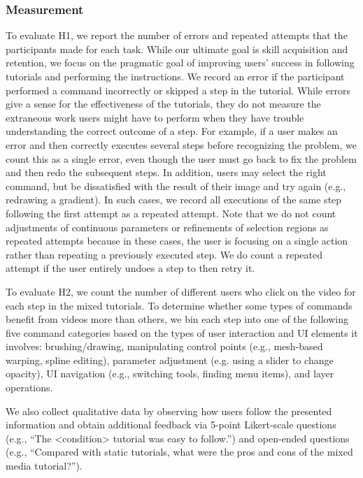 \subsubsection{Measurement}
To evaluate H1, we report the number of errors and repeated attempts that the participants made for each task. While our ultimate goal is skill acquisition and retention, we focus on the pragmatic goal of improving users' success in following tutorials and performing the instructions. We record an error if the participant performed a command incorrectly or skipped a step in the tutorial. While errors give a sense for the effectiveness of the tutorials, they do not measure the extraneous work users might have to perform when they have trouble understanding the correct outcome of a step. For example, if a user makes an error and then correctly executes several steps before recognizing the problem, we count this as a single error, even though the user must go back to fix the problem and then redo the subsequent steps. In addition, users may select the right command, but be dissatisfied with the result of their image and try again (e.g., redrawing a gradient). In such cases, we record all executions of the same step following the first attempt as a repeated attempt. Note that we do not count adjustments of continuous parameters or refinements of selection regions as repeated attempts because in these cases, the user is focusing on a single action rather than repeating a previously executed step. We do count a repeated attempt if the user entirely undoes a step to then retry it.

To evaluate H2, we count the number of different users who click on the video for each step in the mixed tutorials. To determine whether some types of commands benefit from videos more than others, we bin each step into one of the following five command categories based on the types of user interaction and UI elements it involves: brushing/drawing, manipulating control points (e.g., mesh-based warping, spline editing), parameter adjustment (e.g. using a slider to change opacity), UI navigation (e.g., switching tools, finding menu items), and layer operations.

We also collect qualitative data by observing how users follow the presented information and obtain additional feedback via 5-point Likert-scale questions (e.g., ``The {\textless}condition{\textgreater} tutorial was easy to follow.'') and open-ended questions (e.g., ``Compared with static tutorials, what were the pros and cons of the mixed media tutorial?'').
